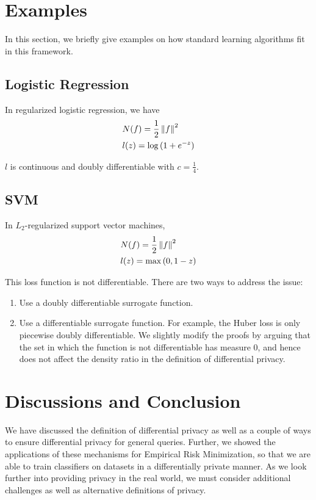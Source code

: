 \documentclass{article} %
\begin{document}
\section{Examples}
In this section, we briefly give examples on how standard learning algorithms fit in this framework.
	\subsection{Logistic Regression}
	In regularized logistic regression, we have
	\begin{align*}
	& N(f) = \frac{1}{2} \left\lVert f\right\rVert^2\\
	& l(z) = \log{(1 + e^{-z})}
	\end{align*}

	$l$ is continuous and doubly differentiable with $c = \frac{1}{4}$.
	\subsection{SVM}
	In $L_2$-regularized support vector machines,
	\begin{align*}
	& N(f) = \frac{1}{2} \left\lVert f\right\rVert^2\\
	& l(z) = \max{(0, 1 - z)}
	\end{align*}

	This loss function is not differentiable. There are two ways to address the issue:
	\begin{enumerate}[label=(\roman*)]
		\item Use a doubly differentiable surrogate function.
		\item Use a differentiable surrogate function.
		For example, the Huber loss is only piecewise doubly differentiable. We slightly modify the proofs by arguing that the set in which the function is not differentiable has measure $0$, and hence does not affect the density ratio in the definition of differential privacy.
	\end{enumerate}

\section{Discussions and Conclusion}

We have discussed the definition of differential privacy as well as a couple of
ways to ensure differential privacy for general queries. Further, we showed the
applications of these mechanisms for Empirical Risk Minimization, so that we
are able to train classifiers on datasets in a differentially private manner.
As we look further into providing privacy in the real world, we must consider
additional challenges as well as alternative definitions of privacy.
\end{document}

